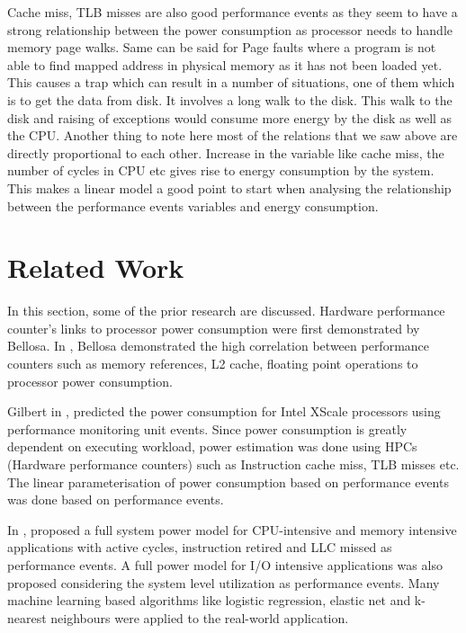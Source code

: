 Cache miss, TLB misses are also good performance events as they seem to have a strong relationship between the power consumption as processor needs to handle memory page walks. Same can be said for Page faults where a program is not able to find mapped address in physical memory as it has not been loaded yet. This causes a trap which can result in a number of situations, one of them which is to get the data from disk. It involves a long walk to the disk. This walk to the disk and raising of exceptions would consume more energy by the disk as well as the CPU. Another thing to note here most of the relations that we saw above are directly proportional to each other. Increase in the variable like cache miss, the number of cycles in CPU etc gives rise to energy consumption by the system. This makes a linear model a good point to start when analysing the relationship between the performance events variables and energy consumption.

\section{Related Work}

In this section, some of the prior research are discussed. Hardware performance counter's links to processor power consumption were first demonstrated by Bellosa. In \cite{bellosa2000benefits}, Bellosa demonstrated the high correlation between performance counters such as memory references, L2 cache, floating point operations to processor power consumption.

Gilbert in \cite{gilberto2005power}, predicted the power consumption for Intel XScale processors using performance monitoring unit events. Since power consumption is greatly dependent on executing workload, power estimation was done using HPCs (Hardware performance counters) such as Instruction cache miss, TLB misses etc. The linear parameterisation of power consumption based on performance events was done based on performance events. 

In \cite{yang2016performance}, proposed a full system power model for CPU-intensive and memory intensive applications with active cycles, instruction retired and LLC missed as performance events. A full power model for I/O intensive applications was also proposed considering the system level utilization as performance events. Many machine learning based algorithms like logistic regression, elastic net and k-nearest neighbours were applied to the real-world application. 

